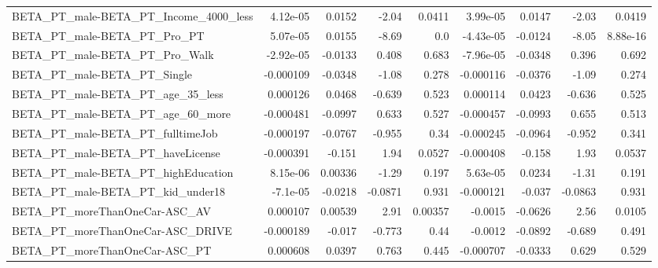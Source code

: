 \begin{tabular}{lrrrrrrrr}
BETA\_PT\_male-BETA\_PT\_Income\_4000\_less              &    4.12e-05 &       0.0152 &     -2.04 &   0.0411 &   3.99e-05 &      0.0147 &        -2.03 &        0.0419 \\
BETA\_PT\_male-BETA\_PT\_Pro\_PT                        &    5.07e-05 &       0.0155 &     -8.69 &      0.0 &  -4.43e-05 &     -0.0124 &        -8.05 &      8.88e-16 \\
BETA\_PT\_male-BETA\_PT\_Pro\_Walk                      &   -2.92e-05 &      -0.0133 &     0.408 &    0.683 &  -7.96e-05 &     -0.0348 &        0.396 &         0.692 \\
BETA\_PT\_male-BETA\_PT\_Single                        &   -0.000109 &      -0.0348 &     -1.08 &    0.278 &  -0.000116 &     -0.0376 &        -1.09 &         0.274 \\
BETA\_PT\_male-BETA\_PT\_age\_35\_less                   &    0.000126 &       0.0468 &    -0.639 &    0.523 &   0.000114 &      0.0423 &       -0.636 &         0.525 \\
BETA\_PT\_male-BETA\_PT\_age\_60\_more                   &   -0.000481 &      -0.0997 &     0.633 &    0.527 &  -0.000457 &     -0.0993 &        0.655 &         0.513 \\
BETA\_PT\_male-BETA\_PT\_fulltimeJob                   &   -0.000197 &      -0.0767 &    -0.955 &     0.34 &  -0.000245 &     -0.0964 &       -0.952 &         0.341 \\
BETA\_PT\_male-BETA\_PT\_haveLicense                   &   -0.000391 &       -0.151 &      1.94 &   0.0527 &  -0.000408 &      -0.158 &         1.93 &        0.0537 \\
BETA\_PT\_male-BETA\_PT\_highEducation                 &    8.15e-06 &      0.00336 &     -1.29 &    0.197 &   5.63e-05 &      0.0234 &        -1.31 &         0.191 \\
BETA\_PT\_male-BETA\_PT\_kid\_under18                   &    -7.1e-05 &      -0.0218 &   -0.0871 &    0.931 &  -0.000121 &      -0.037 &      -0.0863 &         0.931 \\
BETA\_PT\_moreThanOneCar-ASC\_AV                      &    0.000107 &      0.00539 &      2.91 &  0.00357 &    -0.0015 &     -0.0626 &         2.56 &        0.0105 \\
BETA\_PT\_moreThanOneCar-ASC\_DRIVE                   &   -0.000189 &       -0.017 &    -0.773 &     0.44 &    -0.0012 &     -0.0892 &       -0.689 &         0.491 \\
BETA\_PT\_moreThanOneCar-ASC\_PT                      &    0.000608 &       0.0397 &     0.763 &    0.445 &  -0.000707 &     -0.0333 &        0.629 &         0.529 \\

\end{tabular}
